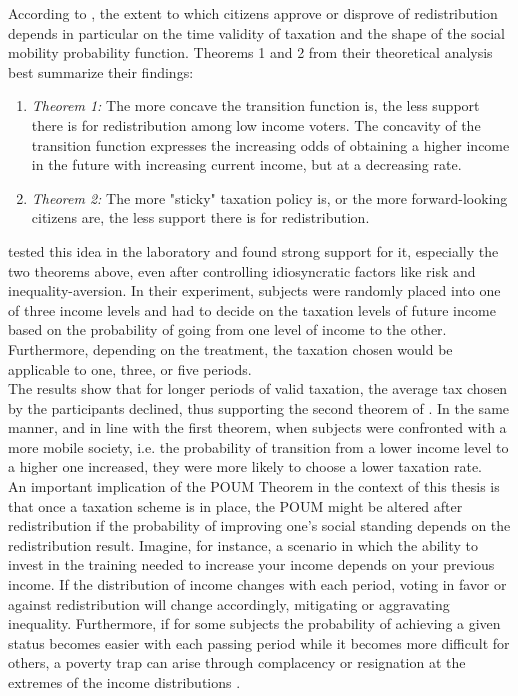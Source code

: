 According to \citeauthor{benabou2001}, the extent to which citizens approve or disprove of redistribution depends in particular on the time validity of taxation and the shape of the social mobility probability function. Theorems 1 and 2 from their theoretical analysis best summarize their findings:\\
\begin{enumerate}
    \item \textit{Theorem 1:} The more concave the transition function is, the less support there is for redistribution among low income voters. The concavity of the transition function expresses the increasing odds of obtaining a higher income in the future with increasing current income, but at a decreasing rate.  
    \item \textit{Theorem 2:} The more "sticky" taxation policy is, or the more forward-looking citizens are, the less support there is for redistribution.
\end{enumerate}

\cite{checchi2003} tested this idea in the laboratory and found strong support for it, especially the two theorems above, even after controlling idiosyncratic factors like risk and inequality-aversion. In their experiment, subjects were randomly placed into one of three income levels and had to decide on the taxation levels of future income based on the probability of going from one level of income to the other. Furthermore, depending on the treatment, the taxation chosen would be applicable to one, three, or five periods.\\

The results show that for longer periods of valid taxation, the average tax chosen by the participants declined, thus supporting the second theorem of \citeauthor{benabou2001}. In the same manner, and in line with the first theorem, when subjects were confronted with a more mobile society, i.e. the probability of transition from a lower income level to a higher one increased, they were more likely to choose a lower taxation rate.\\

An important implication of the POUM Theorem in the context of this thesis is that once a taxation scheme is in place, the POUM might be altered after redistribution if the probability of improving one's social standing depends on the redistribution result. Imagine, for instance, a scenario in which the ability to invest in the training needed to increase your income depends on your previous income. If the distribution of income changes with each period, voting in favor or against redistribution will change accordingly, mitigating or aggravating inequality. Furthermore, if for some subjects the probability of achieving a given status becomes easier with each passing period while it becomes more difficult for others, a poverty trap can arise through complacency or resignation at the extremes of the income distributions \citep{ceroni2001, ku2012}.

